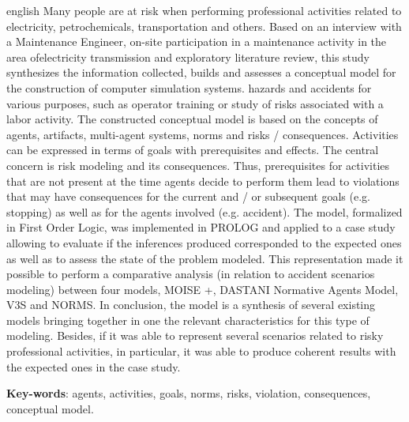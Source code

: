 \begin{resumo}[Abstract]
 \begin{otherlanguage*}{english}
Many people are at risk when performing professional activities related to electricity, petrochemicals, transportation and others. Based on an interview with a Maintenance Engineer, on-site participation in a maintenance activity in the area of ​​electricity transmission and exploratory literature review, this study synthesizes the information collected, builds and assesses a conceptual model for the construction of computer simulation systems. hazards and accidents for various purposes, such as operator training or study of risks associated with a labor activity. The constructed conceptual model is based on the concepts of agents, artifacts, multi-agent systems, norms and risks / consequences. Activities can be expressed in terms of goals with prerequisites and effects. The central concern is risk modeling and its consequences. Thus, prerequisites for activities that are not present at the time agents decide to perform them lead to violations that may have consequences for the current and / or subsequent goals (e.g. stopping) as well as for the agents involved (e.g. accident). The model, formalized in First Order Logic, was implemented in PROLOG and applied to a case study allowing to evaluate if the inferences produced corresponded to the expected ones as well as to assess the state of the problem modeled. This representation made it possible to perform a comparative analysis (in relation to accident scenarios modeling) between four models, MOISE +, DASTANI Normative Agents Model, V3S and NORMS. In conclusion, the model is a synthesis of several existing models bringing together in one the relevant characteristics for this type of modeling. Besides, if it was able to represent several scenarios related to risky professional activities, in particular, it was able to produce coherent results with the expected ones in the case study.
   \vspace{\onelineskip}
 
   \noindent 
   \textbf{Key-words}: agents, activities, goals, norms, risks, violation, consequences, conceptual model.
 \end{otherlanguage*}
\end{resumo}

